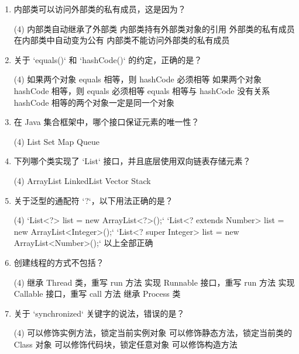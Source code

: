 \documentclass[a3paper, landscape, 11pt, twocolumn]{article}
\begin{document}
\begin{enumerate}[label=\arabic*., itemsep=0.8em]
	\item 内部类可以访问外部类的私有成员，这是因为？
	      \begin{tasks}(4)
		      \task 内部类自动继承了外部类
		      \task 内部类持有外部类对象的引用
		      \task 外部类的私有成员在内部类中自动变为公有
		      \task 内部类不能访问外部类的私有成员
	      \end{tasks}

	\item 关于 `equals()` 和 `hashCode()` 的约定，正确的是？
	      \begin{tasks}(4)
		      \task 如果两个对象 equals 相等，则 hashCode 必须相等
		      \task 如果两个对象 hashCode 相等，则 equals 必须相等
		      \task equals 相等与 hashCode 没有关系
		      \task hashCode 相等的两个对象一定是同一个对象
	      \end{tasks}

	\item 在 Java 集合框架中，哪个接口保证元素的唯一性？
	      \begin{tasks}(4)
		      \task List \task Set \task Map \task Queue
	      \end{tasks}

	\item 下列哪个类实现了 `List` 接口，并且底层使用双向链表存储元素？
	      \begin{tasks}(4)
		      \task ArrayList \task LinkedList \task Vector \task Stack
	      \end{tasks}

	\item 关于泛型的通配符 `?`，以下用法正确的是？
	      \begin{tasks}(4)
		      \task `List<?> list = new ArrayList<?>();`
		      \task `List<? extends Number> list = new ArrayList<Integer>();`
		      \task `List<? super Integer> list = new ArrayList<Number>();`
		      \task 以上全部正确
	      \end{tasks}

	\item 创建线程的方式不包括？
	      \begin{tasks}(4)
		      \task 继承 Thread 类，重写 run 方法
		      \task 实现 Runnable 接口，重写 run 方法
		      \task 实现 Callable 接口，重写 call 方法
		      \task 继承 Process 类
	      \end{tasks}

	\item 关于 `synchronized` 关键字的说法，错误的是？
	      \begin{tasks}(4)
		      \task 可以修饰实例方法，锁定当前实例对象
		      \task 可以修饰静态方法，锁定当前类的 Class 对象
		      \task 可以修饰代码块，锁定任意对象
		      \task 可以修饰构造方法
	      \end{tasks}


\end{enumerate}
\end{document}
